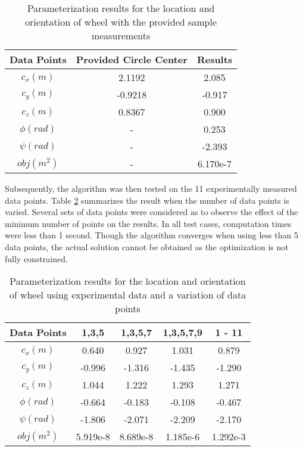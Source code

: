\documentclass[12pt]{article}
\begin{document}
\begin{table}[ht!]
\begin{center}
\begin{tabular}{|c|c|c|}
\hline
\textbf{Data Points}  & \textbf{Provided Circle Center} & \textbf{Results} \\ \hline
$c_x (m)$ & 2.1192 & 2.085  \\ \hline
$c_y (m)$ & -0.9218 &-0.917  \\ \hline
$c_z (m)$ & 0.8367  & 0.900   \\ \hline
$\phi (rad)$ & - &  0.253 \\ \hline
$\psi (rad)$ & - & -2.393 \\ \hline
$obj (m^2)$ & - & 6.170e-7  \\ \hline
\end{tabular}
\caption{Parameterization results for the location and orientation of wheel with the provided sample measurements}
\label{tab:richter_data_point_results_param}
\end{center}
\end{table}

Subsequently, the algorithm was then tested on the 11 experimentally measured data points.  Table \ref{tab:test_data_point_results_param} summarizes the result when the number of data points is varied. Several sets of data points were considered as to observe the effect of the minimum number of points on the results.  In all test cases, computation times were less than 1 second. Though the algorithm converges  when using less than 5 data points, the actual solution cannot be obtained as the optimization is not fully constrained. 

\begin{table}[ht!]
\begin{center}
\begin{tabular}{|c|c|c|c|c|}
\hline
\textbf{Data Points}  & \textbf{1,3,5}  & \textbf{1,3,5,7} & \textbf{1,3,5,7,9} & \textbf{1 - 11}  \\ \hline
$c_x (m)$ &0.640 &  0.927 & 1.031 & 0.879 \\ \hline
$c_y (m)$ &-0.996 &   -1.316 & -1.435 & -1.290 \\ \hline
$c_z (m)$  &1.044  & 1.222 & 1.293 & 1.271 \\ \hline
$\phi (rad)$&  -0.664 & -0.183 & -0.108 & -0.467\\ \hline
$\psi (rad)$& -1.806 & -2.071 & -2.209 & -2.170\\ \hline
$obj (m^2)$ & 5.919e-8 & 8.689e-8 & 1.185e-6 & 1.292e-3 \\ \hline
\end{tabular}
\caption{Parameterization results for the location and orientation of wheel using experimental data and a variation of data points}
\label{tab:test_data_point_results_param}
\end{center}
\end{table}
\end{document}
